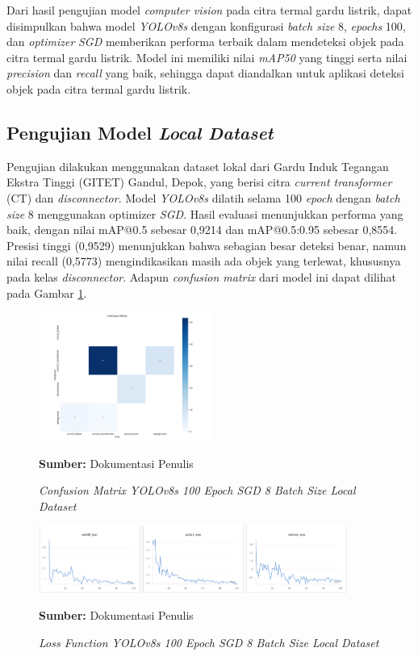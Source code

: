 Dari hasil pengujian model \emph{computer vision} pada citra termal gardu
listrik, dapat disimpulkan bahwa model \emph{YOLOv8s} dengan konfigurasi \emph{batch
size} 8, \emph{epochs} 100, dan \emph{optimizer} \emph{SGD} memberikan performa
terbaik dalam mendeteksi objek pada citra termal gardu listrik. Model ini memiliki
nilai \emph{mAP50} yang tinggi serta nilai \emph{precision} dan \emph{recall}
yang baik, sehingga dapat diandalkan untuk aplikasi deteksi objek pada citra termal
gardu listrik.

\subsection{Pengujian Model \emph{Local Dataset}}
Pengujian dilakukan menggunakan dataset lokal dari Gardu Induk Tegangan Ekstra Tinggi (GITET) Gandul, Depok, yang berisi citra \emph{current transformer} (CT) dan \emph{disconnector}. Model \emph{YOLOv8s} dilatih selama 100 \emph{epoch} dengan \emph{batch size} 8 menggunakan optimizer \emph{SGD}. Hasil evaluasi menunjukkan performa yang baik, dengan nilai mAP@0.5 sebesar 0{,}9214 dan mAP@0.5:0.95 sebesar 0{,}8554. Presisi tinggi (0{,}9529) menunjukkan bahwa sebagian besar deteksi benar, namun nilai recall (0{,}5773) mengindikasikan masih ada objek yang terlewat, khususnya pada kelas \emph{disconnector}. Adapun \emph{confusion matrix} dari model ini dapat dilihat pada Gambar \ref{fig:conf_matrix_gitet}.

\begin{figure}[H]
  \centering
  \includegraphics[width=0.5\textwidth]{gambar/bab4/cf_new.png}
  \caption{\emph{Confusion Matrix YOLOv8s 100 Epoch SGD 8 Batch Size Local Dataset}}
  \label{fig:conf_matrix_gitet}
    \footnotesize{\textbf{Sumber:} Dokumentasi Penulis}
\end{figure}

\begin{figure}[H]
    \centering
    \includegraphics[width=0.9\textwidth]{gambar/bab4/lf.png}
    \caption{\emph{Loss Function YOLOv8s 100 Epoch SGD 8 Batch Size Local Dataset}}
    \label{fig:loss_function_gitet}
      \footnotesize{\textbf{Sumber:} Dokumentasi Penulis}
  \end{figure}
  


